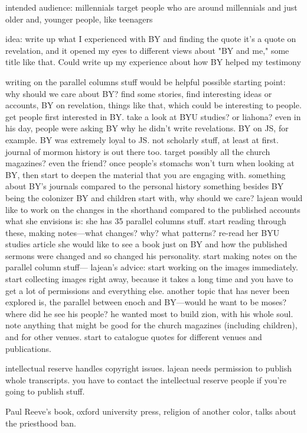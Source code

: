 intended audience: millennials
	target people who are around millennials and just older
	and, younger people, like teenagers

idea: write up what I experienced with BY and finding the quote
	it's a quote on revelation, and it opened my eyes to different views about
	"BY and me," some title like that. Could write up my experience about how BY helped my testimony
	
writing on the parallel columns stuff would be helpful
	possible starting point: why should we care about BY? find some stories, find interesting ideas or accounts, BY on revelation, things like that, which could be interesting to people.
	get people first interested in BY. 
	take a look at BYU studies? or liahona?
	even in his day, people were asking BY why he didn't write revelations.
	BY on JS, for example. BY was extremely loyal to JS.
	not scholarly stuff, at least at first.
	journal of mormon history is out there too.
	target possibly all the church magazines? even the friend?
	once people's stomachs won't turn when looking at BY, then start to deepen the material that you are engaging with.
	something about BY's journals compared to the personal history
	something besides BY being the colonizer
	BY and children
	start with, why should we care?
	lajean would like to work on the changes in the shorthand compared to the published accounts
		what she envisions is: she has 35 parallel columns stuff. start reading through these, making notes---what changes? why? what patterns?
		re-read her BYU studies article
		she would like to see a book just on BY and how the published sermons were changed and so changed his personality.
		start making notes on the parallel column stuff---
		lajean's advice: start working on the images immediately. start collecting images right away, because it takes a long time and you have to get a lot of permissions and everything else.
	another topic that has never been explored is, the parallel between enoch and BY---would he want to be moses? where did he see his people? he wanted most to build zion, with his whole soul.
	note anything that might be good for the church magazines (including children), and for other venues. start to catalogue quotes for different venues and publications.
	
intellectual reserve handles copyright issues.
	lajean needs permission to publish whole transcripts.
	you have to contact the intellectual reserve people if you're going to publish stuff.
	
Paul Reeve's book, oxford university press, religion of another color, talks about the priesthood ban.

